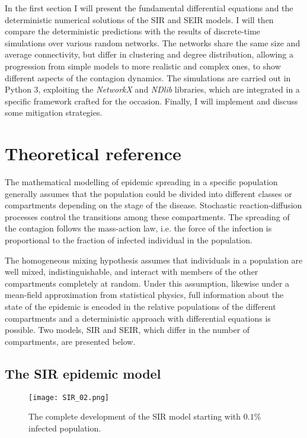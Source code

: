 \documentclass[DIV=12, BCOR=0pt]{scrartcl}  %
\begin{document}
 	In the first section I will present the fundamental differential equations and the deterministic numerical solutions of the SIR and SEIR models. I will then compare the deterministic predictions with the results of discrete-time simulations over various random networks. The networks share the same size and average connectivity, but differ in clustering and degree distribution, allowing a progression from simple models to more realistic and complex ones, to show different aspects of the contagion dynamics. The simulations are carried out in Python 3, exploiting the \textit{NetworkX} and \textit{NDlib} libraries, which are integrated in a specific framework crafted for the occasion. %
 	Finally, I will implement and discuss some mitigation strategies.
  
  \section{Theoretical reference}
  \label{sec:theory}
	The mathematical modelling of epidemic spreading in a specific population generally assumes that the population could be divided into different classes or compartments depending on the stage of the disease.
	Stochastic reaction-diffusion processes control the transitions among these compartments. 
	The spreading of the contagion follows the mass-action law, i.e. the force of the infection is proportional to the fraction of infected individual in the population.
	
  The homogeneous mixing hypothesis assumes that individuals in a population are well mixed, indistinguishable, and interact with members of the other compartments completely at random.
  Under this assumption, likewise under a mean-field approximation from statistical physics, full information about the state of the epidemic is encoded in the relative populations of the different compartments and a deterministic approach with differential equations is possible. Two models, SIR and SEIR, which differ in the number of compartments, are presented below.
   
  \subsection{The SIR epidemic model}
  
  \begin{figure}[h]
  	\centering
  	\texttt{[image: SIR\_02.png]}
  	\caption{The complete development of the SIR model starting with $0.1\%$ infected population.}
  	\label{fig:SIRtot}
  \end{figure}
\end{document}
